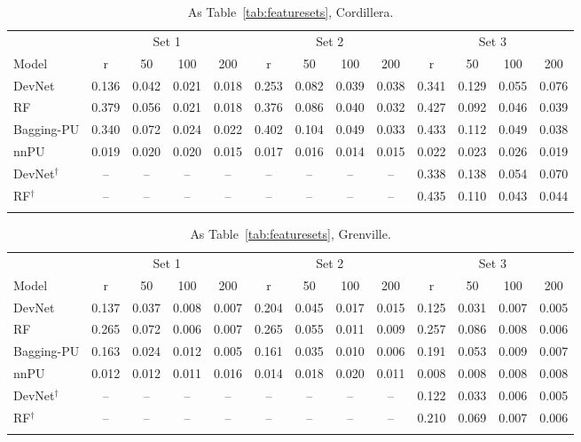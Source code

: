 \documentclass[pdflatex,sn-apa]{sn-jnl}
\begin{document}
\begin{appendices}
\begin{table}[!h]
\caption{As Table~\ref{tab:featuresets}, Cordillera.}\label{tab:featuresets-cord}
\scriptsize
\setlength{\tabcolsep}{1.5pt}
\begin{tabular*}{\textwidth}{@{\extracolsep\fill}lcccccccccccc}
\toprule
 & \multicolumn{4}{c}{Set 1} & \multicolumn{4}{c}{Set 2} & \multicolumn{4}{c}{Set 3} \\
\cmidrule(lr){2-5}\cmidrule(lr){6-9}\cmidrule(lr){10-13}
Model & r & 50 & 100 & 200 & r & 50 & 100 & 200 & r & 50 & 100 & 200 \\
\midrule
DevNet & 0.136 & 0.042 & 0.021 & 0.018 & 0.253 & 0.082 & 0.039 & 0.038 & 0.341 & 0.129 & 0.055 & 0.076 \\
RF & 0.379 & 0.056 & 0.021 & 0.018 & 0.376 & 0.086 & 0.040 & 0.032 & 0.427 & 0.092 & 0.046 & 0.039 \\
Bagging-PU & 0.340 & 0.072 & 0.024 & 0.022 & 0.402 & 0.104 & 0.049 & 0.033 & 0.433 & 0.112 & 0.049 & 0.038 \\
nnPU & 0.019 & 0.020 & 0.020 & 0.015 & 0.017 & 0.016 & 0.014 & 0.015 & 0.022 & 0.023 & 0.026 & 0.019 \\
DevNet$^\dagger$ & -- & -- & -- & -- & -- & -- & -- & -- & 0.338 & 0.138 & 0.054 & 0.070 \\
RF$^\dagger$ & -- & -- & -- & -- & -- & -- & -- & -- & 0.435 & 0.110 & 0.043 & 0.044 \\
\botrule
\end{tabular*}
\end{table}

\begin{table}[!h]
\caption{As Table~\ref{tab:featuresets}, Grenville.}\label{tab:featuresets-gren}
\scriptsize
\setlength{\tabcolsep}{1.5pt}
\begin{tabular*}{\textwidth}{@{\extracolsep\fill}lcccccccccccc}
\toprule
 & \multicolumn{4}{c}{Set 1} & \multicolumn{4}{c}{Set 2} & \multicolumn{4}{c}{Set 3} \\
\cmidrule(lr){2-5}\cmidrule(lr){6-9}\cmidrule(lr){10-13}
Model & r & 50 & 100 & 200 & r & 50 & 100 & 200 & r & 50 & 100 & 200 \\
\midrule
DevNet & 0.137 & 0.037 & 0.008 & 0.007 & 0.204 & 0.045 & 0.017 & 0.015 & 0.125 & 0.031 & 0.007 & 0.005 \\
RF & 0.265 & 0.072 & 0.006 & 0.007 & 0.265 & 0.055 & 0.011 & 0.009 & 0.257 & 0.086 & 0.008 & 0.006 \\
Bagging-PU & 0.163 & 0.024 & 0.012 & 0.005 & 0.161 & 0.035 & 0.010 & 0.006 & 0.191 & 0.053 & 0.009 & 0.007 \\
nnPU & 0.012 & 0.012 & 0.011 & 0.016 & 0.014 & 0.018 & 0.020 & 0.011 & 0.008 & 0.008 & 0.008 & 0.008 \\
DevNet$^\dagger$ & -- & -- & -- & -- & -- & -- & -- & -- & 0.122 & 0.033 & 0.006 & 0.005 \\
RF$^\dagger$ & -- & -- & -- & -- & -- & -- & -- & -- & 0.210 & 0.069 & 0.007 & 0.006 \\
\botrule
\end{tabular*}
\end{table}


\end{appendices}
\end{document}
